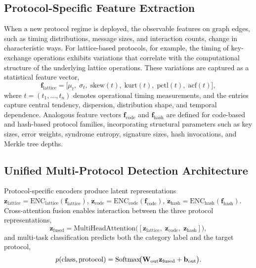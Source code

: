 \subsection{Protocol-Specific Feature Extraction}

When a new protocol regime is deployed, the observable features on graph edges, such as timing distributions, message sizes, and interaction counts, change in characteristic ways. For lattice-based protocols, for example, the timing of key-exchange operations exhibits variations that correlate with the computational structure of the underlying lattice operations. These variations are captured as a statistical feature vector,
\begin{equation}
\mathbf{f}_{\mathrm{lattice}}
= \bigl[\mu_t,\;\sigma_t,\;\mathrm{skew}(t),\;\mathrm{kurt}(t),\;
  \mathrm{pctl}(t),\;\mathrm{acf}(t)\bigr],
\label{eq:pq_feat_lattice}
\end{equation}
where $t=(t_1,\dots,t_n)$ denotes operational timing measurements, and the entries capture central tendency, dispersion, distribution shape, and temporal dependence. Analogous feature vectors $\mathbf{f}_{\mathrm{code}}$ and $\mathbf{f}_{\mathrm{hash}}$ are defined for code-based and hash-based protocol families, incorporating structural parameters such as key sizes, error weights, syndrome entropy, signature sizes, hash invocations, and Merkle tree depths.

\subsection{Unified Multi-Protocol Detection Architecture}

Protocol-specific encoders produce latent representations $\mathbf{z}_{\mathrm{lattice}}=\mathrm{ENC}_{\mathrm{lattice}}(\mathbf{f}_{\mathrm{lattice}})$, $\mathbf{z}_{\mathrm{code}}=\mathrm{ENC}_{\mathrm{code}}(\mathbf{f}_{\mathrm{code}})$, $\mathbf{z}_{\mathrm{hash}}=\mathrm{ENC}_{\mathrm{hash}}(\mathbf{f}_{\mathrm{hash}})$. Cross-attention fusion enables interaction between the three protocol representations,
\begin{equation}
\mathbf{z}_{\mathrm{fused}}
= \mathrm{MultiHeadAttention}\!\bigl(
  [\mathbf{z}_{\mathrm{lattice}},\;
   \mathbf{z}_{\mathrm{code}},\;
   \mathbf{z}_{\mathrm{hash}}]\bigr),
\label{eq:pq_fusion}
\end{equation}
and multi-task classification predicts both the category label and the target protocol,
\begin{equation}
p(\mathrm{class},\mathrm{protocol})
= \mathrm{Softmax}\!\bigl(\mathbf{W}_{\mathrm{out}}\mathbf{z}_{\mathrm{fused}}
  + \mathbf{b}_{\mathrm{out}}\bigr).
\label{eq:pq_class}
\end{equation}

